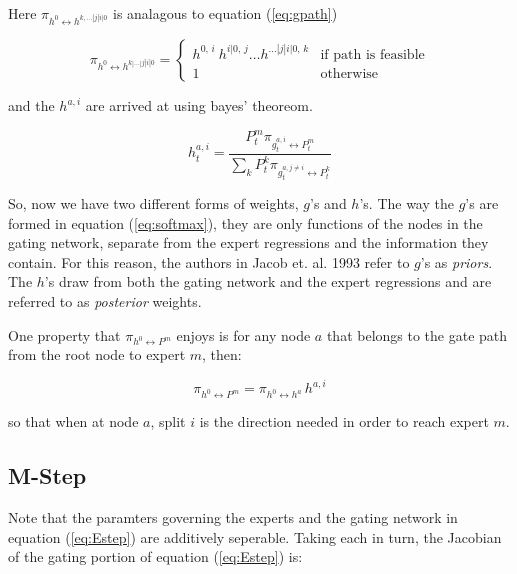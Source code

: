 \documentclass[12pt]{article}
\newcommand{\gateprod}[2]{\pi_{#1 \longleftrightarrow #2}}
\newcommand{\shortsum}[1]{\sum \nolimits_{#1}}
\newcommand{\h}[2]{h^{#1}_{#2}}
\begin{document}
Here $\gateprod{h^{0}}{h^{k,\dots|j|i|0}}$ is analagous to equation (\ref{eq:gpath})

\begin{equation} \label{eq:hpath}
  \gateprod{h^{0}}{h^{k|\ldots|j|i|0}} =
    \begin{cases} 
       h^{0, \, i} \ h^{i|0, \, j} \ldots h^{\dots|j|i|0, \, k} & \textrm{if path is feasible} \\
       1 & \textrm{otherwise}
    \end{cases}
\end{equation}

and the $h^{a, i}$ are arrived at using bayes' theoreom.

\begin{equation} \label{eq:posteriornode}
  \h{a,i}{t} = \frac{P^{m}_{t} \gateprod{g^{a,i}_{t}}{P^{m}_{t}}}{ \shortsum{k} P^{k}_{t} \gateprod{g^{a, j \neq i}_{t}}{P^{k}_{t}}}
\end{equation}

So, now we have two different forms of weights, $g$'s and $h$'s. The
way the $g$'s are formed in equation (\ref{eq:softmax}), they are only
functions of the nodes in the gating network, separate from the
expert regressions and the information they contain. For this reason,
the authors in Jacob et. al. 1993 refer to $g$'s as \textit{priors}.
The $h$'s draw from both the gating network and the expert regressions and
are referred to as \textit{posterior} weights.

One property that $\gateprod{h^{0}}{P^{m}}$ enjoys is for any
node $a$ that belongs to the gate path from the root node
to expert $m$, then:

\begin{equation}
  \gateprod{h^{0}}{P^{m}} = \gateprod{h^{0}}{h^{a}} \, h^{a,i}
\end{equation}

so that when at node $a$, split $i$ is the direction needed in order to
reach expert $m$.

\subsection{M-Step}

Note that the paramters governing the experts and the gating network in
equation (\ref{eq:Estep}) are additively seperable. Taking each in turn, the
Jacobian of the gating portion of equation (\ref{eq:Estep}) is:
\end{document}
